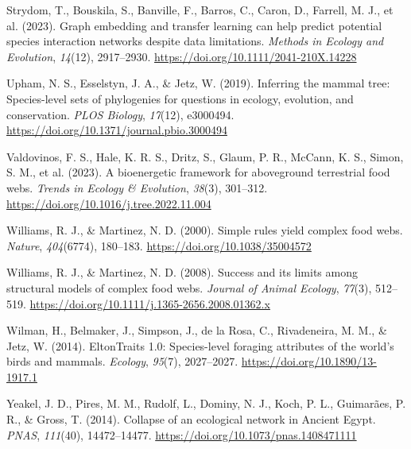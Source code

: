 \documentclass[
]{agujournal2019}
\newlength{\cslhangindent}
\newenvironment{CSLReferences}[2] %
 {\begin{list}{}{%
  \setlength{\itemindent}{0pt}
  \setlength{\leftmargin}{0pt}
  \setlength{\parsep}{0pt}
  \ifodd #1
   \setlength{\leftmargin}{\cslhangindent}
   \setlength{\itemindent}{-1\cslhangindent}
  \fi
  \setlength{\itemsep}{#2\baselineskip}}}
 {\end{list}}
\begin{document}
\begin{CSLReferences}{1}{0}
Strydom, T., Bouskila, S., Banville, F., Barros, C., Caron, D., Farrell,
M. J., et al. (2023). Graph embedding and transfer learning can help
predict potential species interaction networks despite data limitations.
\emph{Methods in Ecology and Evolution}, \emph{14}(12), 2917--2930.
\url{https://doi.org/10.1111/2041-210X.14228}

Upham, N. S., Esselstyn, J. A., \& Jetz, W. (2019). Inferring the mammal
tree: {Species-level} sets of phylogenies for questions in ecology,
evolution, and conservation. \emph{PLOS Biology}, \emph{17}(12),
e3000494. \url{https://doi.org/10.1371/journal.pbio.3000494}

Valdovinos, F. S., Hale, K. R. S., Dritz, S., Glaum, P. R., McCann, K.
S., Simon, S. M., et al. (2023). A bioenergetic framework for
aboveground terrestrial food webs. \emph{Trends in Ecology \&
Evolution}, \emph{38}(3), 301--312.
\url{https://doi.org/10.1016/j.tree.2022.11.004}

Williams, R. J., \& Martinez, N. D. (2000). Simple rules yield complex
food webs. \emph{Nature}, \emph{404}(6774), 180--183.
\url{https://doi.org/10.1038/35004572}

Williams, R. J., \& Martinez, N. D. (2008). Success and its limits among
structural models of complex food webs. \emph{Journal of Animal
Ecology}, \emph{77}(3), 512--519.
\url{https://doi.org/10.1111/j.1365-2656.2008.01362.x}

Wilman, H., Belmaker, J., Simpson, J., de la Rosa, C., Rivadeneira, M.
M., \& Jetz, W. (2014). {EltonTraits} 1.0: {Species-level} foraging
attributes of the world's birds and mammals. \emph{Ecology},
\emph{95}(7), 2027--2027. \url{https://doi.org/10.1890/13-1917.1}

Yeakel, J. D., Pires, M. M., Rudolf, L., Dominy, N. J., Koch, P. L.,
Guimarães, P. R., \& Gross, T. (2014). Collapse of an ecological network
in {Ancient Egypt}. \emph{PNAS}, \emph{111}(40), 14472--14477.
\url{https://doi.org/10.1073/pnas.1408471111}

\end{CSLReferences}
\end{document}
